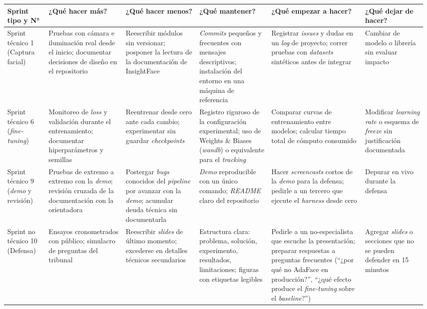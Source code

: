 \documentclass[
  11pt, %
]{charter}
\begin{document}
\begin{table}[htpb]
\small
\renewcommand{\arraystretch}{1.15}
\begin{tabular}{|>{\raggedright\arraybackslash}p{2.2cm}|
>{\raggedright\arraybackslash}p{2.2cm}|
>{\raggedright\arraybackslash}p{2.2cm}|
>{\raggedright\arraybackslash}p{2.2cm}|
>{\raggedright\arraybackslash}p{2.2cm}|
>{\raggedright\arraybackslash}p{2.2cm}|}
\hline
\rowcolor[HTML]{CCCCCC}
\textbf{Sprint tipo y N°} & \textbf{¿Qué hacer más?} & \textbf{¿Qué hacer menos?} & \textbf{¿Qué mantener?} & \textbf{¿Qué empezar a hacer?} & \textbf{¿Qué dejar de hacer?} \\
\hline
Sprint técnico 1 (Captura facial) & Pruebas con cámara e iluminación real desde el inicio; documentar decisiones de diseño en el repositorio & Reescribir módulos sin versionar; posponer la lectura de la documentación de InsightFace & \textit{Commits} pequeños y frecuentes con mensajes descriptivos; instalación del entorno en una máquina de referencia & Registrar \textit{issues} y dudas en un \textit{log} de proyecto; correr pruebas con \textit{datasets} sintéticos antes de integrar & Cambiar de modelo o librería sin evaluar impacto \\
\hline
Sprint técnico 6 (\textit{fine-tuning}) & Monitoreo de \textit{loss} y validación durante el entrenamiento; documentar hiperparámetros y semillas & Reentrenar desde cero ante cada cambio; experimentar sin guardar \textit{checkpoints} & Registro riguroso de la configuración experimental; uso de Weights \& Biases (\textit{wandb}) o equivalente para el \textit{tracking} & Comparar curvas de entrenamiento entre modelos; calcular tiempo total de cómputo consumido & Modificar \textit{learning rate} o esquema de \textit{freeze} sin justificación documentada \\
\hline
Sprint técnico 9 (\textit{demo} y revisión) & Pruebas de extremo a extremo con la \textit{demo}; revisión cruzada de la documentación con la orientadora & Postergar \textit{bugs} conocidos del \textit{pipeline} por avanzar con la \textit{demo}; acumular deuda técnica sin documentarla & \textit{Demo} reproducible con un único comando; \textit{README} claro del repositorio & Hacer \textit{screencasts} cortos de la \textit{demo} para la defensa; pedirle a un tercero que ejecute el \textit{harness} desde cero & Depurar en vivo durante la defensa \\
\hline
Sprint no técnico 10 (Defensa) & Ensayos cronometrados con público; simulacro de preguntas del tribunal & Reescribir \textit{slides} de último momento; excederse en detalles técnicos secundarios & Estructura clara: problema, solución, experimento, resultados, limitaciones; figuras con etiquetas legibles & Pedirle a un no-especialista que escuche la presentación; preparar respuestas a preguntas frecuentes (``¿por qué no AdaFace en producción?'', ``¿qué efecto produce el \textit{fine-tuning} sobre el \textit{baseline}?'') & Agregar \textit{slides} o secciones que no se pueden defender en 15 minutos \\
\hline
\end{tabular}
\end{table}
\end{document}
